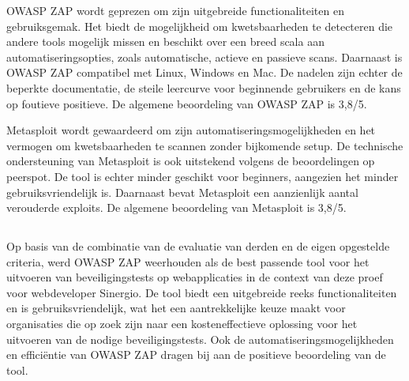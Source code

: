 OWASP ZAP wordt geprezen om zijn uitgebreide functionaliteiten en gebruiksgemak. Het biedt de mogelijkheid om kwetsbaarheden 
te detecteren die andere tools mogelijk missen en beschikt over een breed scala aan automatiseringsopties, zoals automatische, 
actieve en passieve scans. Daarnaast is OWASP ZAP compatibel met Linux, Windows en Mac. De nadelen zijn echter de beperkte 
documentatie, de steile leercurve voor beginnende gebruikers en de kans op foutieve positieve. De algemene beoordeling van 
OWASP ZAP is 3,8/5.

Metasploit wordt gewaardeerd om zijn automatiseringsmogelijkheden en het vermogen om kwetsbaarheden te scannen zonder 
bijkomende setup. De technische ondersteuning van Metasploit is ook uitstekend volgens de beoordelingen op peerspot. De tool 
is echter minder geschikt voor beginners, aangezien het minder gebruiksvriendelijk is. Daarnaast bevat Metasploit een 
aanzienlijk aantal verouderde exploits. De algemene beoordeling van Metasploit is 3,8/5.

\subsection{}
\label{sec:Definitieve_pentesttool}
Op basis van de combinatie van de evaluatie van derden en de eigen opgestelde criteria, werd OWASP ZAP weerhouden als de best passende tool voor het uitvoeren van 
beveiligingstests op webapplicaties in de context van deze proef voor webdeveloper Sinergio. De tool biedt een uitgebreide reeks functionaliteiten en is gebruiksvriendelijk, wat 
het een aantrekkelijke keuze maakt voor organisaties die op zoek zijn naar een kosteneffectieve oplossing voor het uitvoeren 
van de nodige beveiligingstests. Ook de automatiseringsmogelijkheden en efficiëntie van OWASP ZAP dragen bij aan de positieve 
beoordeling van de tool.

\section{}
\subsection{}

